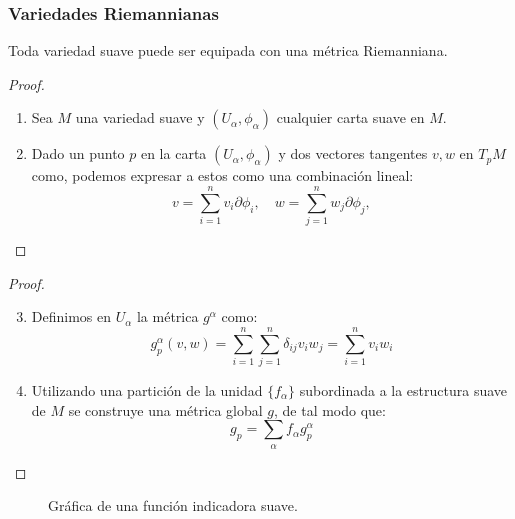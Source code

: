 \begin{frame}
	\frametitle{Variedades Riemannianas}\pause
	\begin{theorem} Toda variedad suave puede ser equipada con una métrica Riemanniana.
	\end{theorem}\pause
	\begin{proof}
		\begin{enumerate}
			\item Sea $M$ una variedad suave y $(U_{\alpha},\phi_{\alpha})$ cualquier carta suave en $M$. \pause
			\item Dado un punto $p$ en la carta $(U_\alpha,\phi_\alpha)$ y dos vectores tangentes $v,w$ en $T_{p}M$ como, podemos expresar a estos como una combinación lineal:
			      \[
				      v = \sum_{i=1}^{n} v_{i} \partial \phi_{i}, \quad
				      w = \sum_{j=1}^{n} w_{j} \partial \phi_{j},
			      \]
		\end{enumerate}
	\end{proof}
\end{frame}

\begin{frame}
	\begin{proof}
		\begin{enumerate}
			\setcounter{enumi}{2}
			\item Definimos en $U_{\alpha}$ la métrica $g^{\alpha}$ como:
			      \[
				      g_{p}^{\alpha}(v,w) = \sum_{i=1}^{n}\sum_{j=1}^{n} \delta_{ij} v_{i}w_{j} = \sum_{i=1}^{n} v_{i} w_{i}
			      \] \pause
			\item Utilizando una partición de la unidad $\{f_{\alpha}\}$ subordinada a la estructura suave de $M$ se construye una métrica global $g$, de tal modo que:
			      \[
				      g_p = \sum_{\alpha} f_{\alpha} g_{p}^{\alpha}
			      \]
		\end{enumerate}
	\end{proof}
\end{frame}

\begin{frame}
	\begin{figure}[t]
		\scalebox{0.75}{}
		\caption{Gráfica de una función indicadora suave.}
	\end{figure}
\end{frame}
